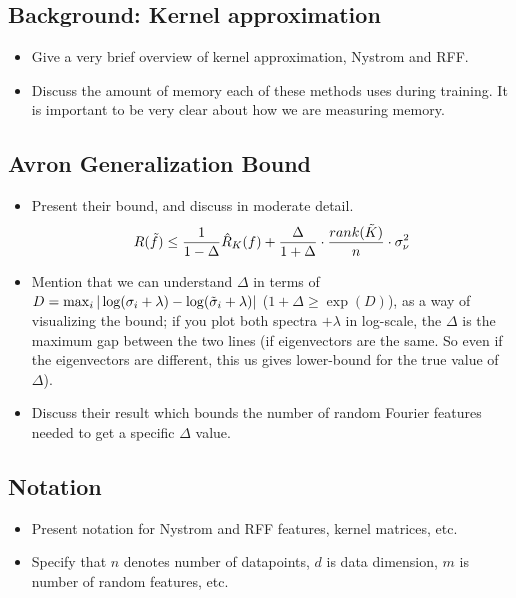 \subsection{Background: Kernel approximation}
\begin{itemize}
	\item Give a very brief overview of kernel approximation, Nystrom and RFF.
	\item Discuss the amount of memory each of these methods uses during training.  It is important to be very clear about how we are measuring memory.
\end{itemize}

\subsection{Avron Generalization Bound}
\begin{itemize}
	\item Present their bound, and discuss in moderate detail. 
	$$R(\tilde{f}) \leq \frac{1}{1-\Delta}\hat{R}_K(f) + \frac{\Delta}{1+\Delta} \cdot \frac{rank(\tilde{K})}{n}\cdot \sigma_{\nu}^2$$ 
	\item Mention that we can understand $\Delta$ in terms of $D =\max_i |\log(\sigma_i + \lambda) - \log(\tilde{\sigma}_i + \lambda)|$ ($1+\Delta \geq \exp(D)$), as a way of visualizing the bound; if you plot both spectra $+\lambda$ in log-scale, the $\Delta$ is the maximum gap between the two lines (if eigenvectors are the same.  So even if the eigenvectors are different, this us gives lower-bound for the true value of $\Delta$).
	\item Discuss their result which bounds the number of random Fourier features needed to get a specific $\Delta$ value.
\end{itemize}

\subsection{Notation}
\begin{itemize}
	\item Present notation for Nystrom and RFF features, kernel matrices, etc.  
	\item Specify that $n$ denotes number of datapoints, $d$ is data dimension, $m$ is number of random features, etc.
\end{itemize}